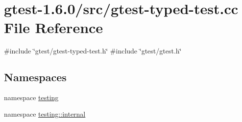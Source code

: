 \hypertarget{gtest-typed-test_8cc}{\section{gtest-\/1.6.0/src/gtest-\/typed-\/test.cc \-File \-Reference}
\label{d9/d5a/gtest-typed-test_8cc}
}
{\ttfamily \#include \char`\"{}gtest/gtest-\/typed-\/test.\-h\char`\"{}}\*
{\ttfamily \#include \char`\"{}gtest/gtest.\-h\char`\"{}}\*
\subsection*{\-Namespaces}
\begin{DoxyCompactItemize}
\item 
namespace \hyperlink{namespacetesting}{testing}
\item 
namespace \hyperlink{namespacetesting_1_1internal}{testing\-::internal}
\end{DoxyCompactItemize}
